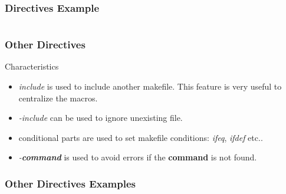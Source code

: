 \documentclass{beamer}
\begin{document}

\begin{frame}
  \frametitle{Directives Example}

  \begin{columns}

    \column{5cm}
      \begin{Example}
        
      \end{Example}

    \column{5cm}
      \begin{Example}
        
      \end{Example}

  \end{columns}

\end{frame}


\begin{frame}
  \frametitle{Other Directives}

  \begin{block}{Characteristics}
    \begin{itemize}
      \item
        \textit{include} is used to include another makefile. This feature
        is very useful to centralize the macros.
      \item
        \textit{-include} can be used to ignore unexisting file.
      \item
        conditional parts are used to set makefile conditions:
        \textit{ifeq}, \textit{ifdef} etc..
      \item
        \textit{-\textbf{command}} is used to avoid errors if the
        \textbf{command} is not found.
    \end{itemize}
  \end{block}

\end{frame}


\begin{frame}
  \frametitle{Other Directives Examples}

  \begin{Example}
    
  \end{Example}

\end{frame}

%
%
\end{document}
